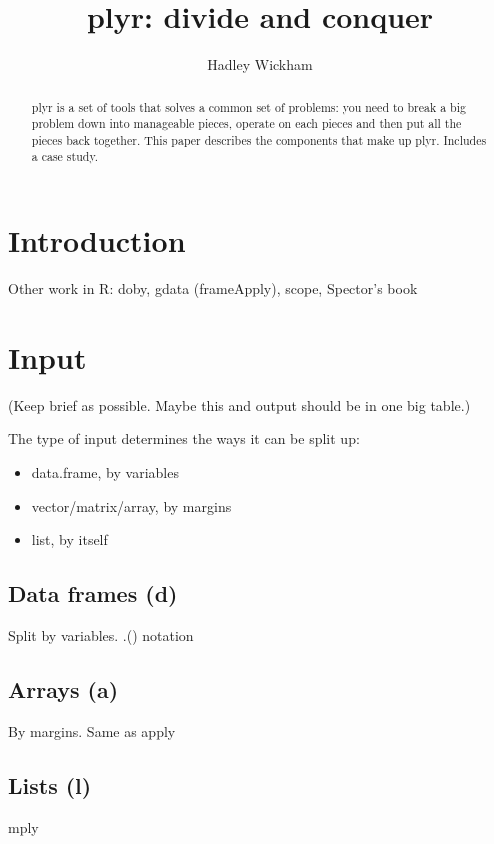 \documentclass[letterpaper,oneside]{scrartcl}
\title{plyr: divide and conquer}
\author{Hadley Wickham}
\begin{document}
\maketitle

\begin{abstract}
plyr is a set of tools that solves a common set of problems: you need to break a big problem down into manageable pieces, operate on each pieces and then put all the pieces back together.  This paper describes the components that make up plyr.  Includes a case study.
\end{abstract}

\section{Introduction}


Other work in R: doby, gdata (frameApply), scope, Spector's book

\section{Input} 

(Keep brief as possible. Maybe this and output should be in one big table.)

The type of input determines the ways it can be split up:

\begin{itemize}
  \item data.frame, by variables
  \item vector/matrix/array, by margins
  \item list, by itself
\end{itemize}

\subsection{Data frames (d)}

Split by variables.  .() notation

\subsection{Arrays (a)}

By margins.  Same as apply

\subsection{Lists (l)}

mply
\end{document}

